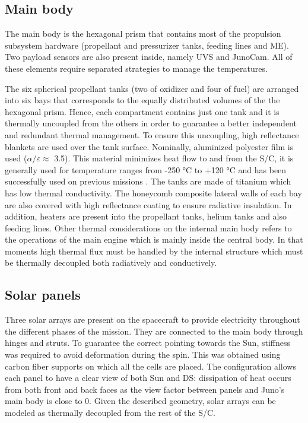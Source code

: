     \subsection{Main body}
    \label{subsec:main_body}
    The main body is the hexagonal prism that contains most of the propulsion subsystem hardware (propellant and pressurizer tanks, feeding lines and ME). Two payload sensors are also present inside, namely UVS and JunoCam. All of these elements require separated strategies to manage the temperatures. 
    
    The six spherical propellant tanks (two of oxidizer and four of fuel) are arranged into six bays that corresponds to the equally distributed volumes of the the hexagonal prism. Hence, each compartment contains just one tank and it is thermally uncoupled from the others in order to guarantee a better independent and redundant thermal management. To ensure this uncoupling, high reflectance blankets are used over the tank surface. Nominally, aluminized polyester film is used ($\alpha / \varepsilon \approx$ 3.5). This material minimizes heat flow to and from the S/C, it is generally used for temperature ranges from -250 °C to +120 °C and has been successfully used on previous missions \cite{alum_poly}. The tanks are made of titanium which has low thermal conductivity. 
    The honeycomb composite lateral walls of each bay are also covered with high reflectance coating to ensure radiative insulation.
    In addition, heaters are present into the propellant tanks, helium tanks and also feeding lines. \cite{LL_early_cruise}
    Other thermal considerations on the internal main body refers to the  operations of the main engine which is mainly inside the central body. In that moments high thermal flux must be handled by the internal structure which must be thermally decoupled both radiatively and conductively. %

    \subsection{Solar panels}
    \label{subsec:solar_panels}
    Three solar arrays are present on the spacecraft to provide electricity throughout the different phases of the mission. They are connected to the main body through hinges and struts. To guarantee the correct pointing towards the Sun, stiffness was required to avoid deformation during the spin. This was obtained using carbon fiber supports on which all the cells are placed. The configuration allows each panel to have a clear view of both Sun and DS: dissipation of heat occurs from both front and back faces as the view factor between panels and Juno's main body is close to 0. Given the described geometry, solar arrays can be modeled as thermally decoupled from the rest of the S/C.
     
